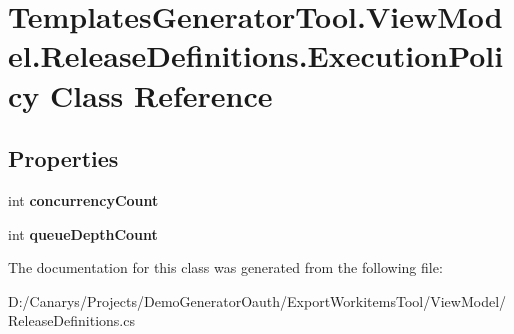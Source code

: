 \hypertarget{class_templates_generator_tool_1_1_view_model_1_1_release_definitions_1_1_execution_policy}{}\section{Templates\+Generator\+Tool.\+View\+Model.\+Release\+Definitions.\+Execution\+Policy Class Reference}
\label{class_templates_generator_tool_1_1_view_model_1_1_release_definitions_1_1_execution_policy}
\subsection*{Properties}
\begin{DoxyCompactItemize}
\item 
\mbox{\label{class_templates_generator_tool_1_1_view_model_1_1_release_definitions_1_1_execution_policy_ac40d7d6db8bd432fb711ede009bdc214}} 
int {\bfseries concurrency\+Count}
\item 
\mbox{\label{class_templates_generator_tool_1_1_view_model_1_1_release_definitions_1_1_execution_policy_a44d63c5c4d1423a7a848e9971d82f5c8}} 
int {\bfseries queue\+Depth\+Count}
\end{DoxyCompactItemize}


The documentation for this class was generated from the following file\+:\begin{DoxyCompactItemize}
\item 
D\+:/\+Canarys/\+Projects/\+Demo\+Generator\+Oauth/\+Export\+Workitems\+Tool/\+View\+Model/Release\+Definitions.\+cs\end{DoxyCompactItemize}
